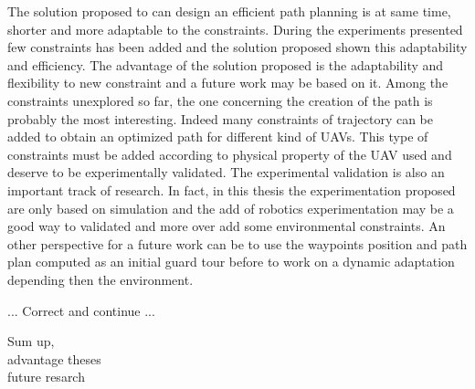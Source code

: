 The solution proposed to can design an efficient path planning is at same time, shorter and more adaptable to the constraints. During the experiments presented few constraints has been added and the solution proposed shown this adaptability and efficiency. 
The advantage of the solution proposed is the adaptability and flexibility to new constraint and  a future work may be based on it. %
Among the constraints unexplored so far, the one concerning the creation of the path is probably the most interesting.  Indeed many constraints of trajectory can be added to obtain an optimized path for different kind of UAVs. This type of constraints must be added according to physical property of the UAV used and deserve to be experimentally validated. 
The experimental validation is also an important track of research. In fact, in this thesis the experimentation proposed are only based on simulation and the add of robotics experimentation may be a good way to validated and more over add some environmental constraints.  
An other perspective for a future work can be to use the waypoints position and path plan computed as an initial guard tour before to work on a dynamic adaptation depending then the environment.



... Correct and continue ...

 
%		
		
		Sum up,\\ 
		advantage theses\\
		future resarch